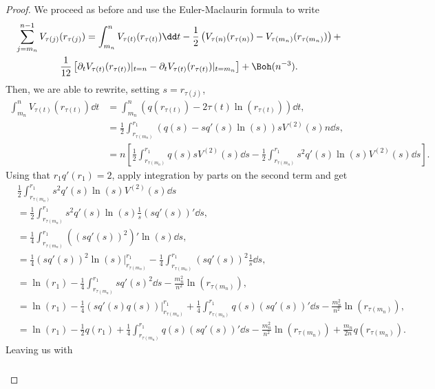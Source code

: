 \begin{proof}
We proceed as before and use the Euler-Maclaurin formula to write
\begin{multline}
	\sum_{j=m_n}^{n-1} V_{\tau(j)}(r_{\tau(j)}) = \int_{m_n}^n V_{\tau(t)}(r_{\tau(t)})  \dd t - \frac{1}{2} \left( V_{\tau(n)}(r_{\tau(n)})  - V_{\tau(m_n)}(r_{\tau(m_n)}) \right) + \\ \frac{1}{12} \left[ \partial_t V_{\tau(t)}(r_{\tau(t)}) |_{t=n} - \partial_t V_{\tau(t)}(r_{\tau(t)}) |_{t=m_n} \right] + \Boh(n^{-3}).
	\label{Equation: EulerMaclaurin 1 disk}
\end{multline}
Then, we are able to rewrite, setting $s = r_{\tau(j)}$,
\begin{align}
	\int_{m_n}^n V_{\tau(t)}(r_{\tau(t)})  \dd t & = \int_{m_n}^n (q(r_{\tau(t)}) - 2 \tau(t) \ln(r_{\tau(t)})) \dd t, \\
	& = \frac{1}{2} \int_{r_{\tau(m_n)}}^{r_1} (q(s) - s q'(s) \ln(s)) s V^{(2)}(s) n \dd s, \\
	& = n \left[  \frac{1}{2} \int_{r_{\tau(m_n)}}^{r_1} q(s) s V^{(2)}(s) \dd s -  \frac{1}{2} \int_{r_{\tau(m_n)}}^{r_1} s^2 q'(s) \ln(s) V^{(2)}(s) \dd s \right].
\end{align}
Using that $r_1 q'(r_1) = 2$, apply integration by parts on the second term and get
\begin{align}
	& \frac{1}{2} \int_{r_{\tau(m_n)}}^{r_1} s^2 q'(s) \ln(s) V^{(2)}(s) \dd s \\
	& = \frac{1}{2} \int_{r_{\tau(m_n)}}^{r_1} s^2 q'(s) \ln(s) \frac{1}{s} (s q'(s))' \dd s, \\
	& = \frac{1}{4} \int_{r_{\tau(m_n)}}^{r_1} ((sq'(s))^2)' \ln(s) \dd s, \\
	& = \frac{1}{4} (s q'(s))^2 \ln(s) |_{r_{\tau(m_n)}}^{r_1} - \frac{1}{4}  \int_{r_{\tau(m_n)}}^{r_1} (s q'(s))^2 \frac{1}{s} \dd s, \\
	& = \ln(r_1) - \frac{1}{4} \int_{r_{\tau(m_n)}}^{r_1} s q'(s)^2 \dd s - \frac{m_n^2}{n^2} \ln(r_{\tau(m_n)}), \\
	& = \ln(r_1) - \frac{1}{4} (s q'(s) q(s)) |_{r_{\tau(m_n)}}^{r_1} + \frac{1}{4} \int_{r_{\tau(m_n)}}^{r_1} q(s) (s q'(s))' \dd s  - \frac{m_n^2}{n^2} \ln(r_{\tau(m_n)}), \\
	& = \ln(r_1) - \frac{1}{2} q(r_1) + \frac{1}{4} \int_{r_{\tau(m_n)}}^{r_1} q(s) (s q'(s))'\dd s  - \frac{m_n^2}{n^2} \ln(r_{\tau(m_n)}) + \frac{m_n}{2 n} q(r_{\tau(m_n)}).
\end{align}
Leaving us with
\begin{align}
	& \begin{multlined}

\end{multlined}
\end{align}
\end{proof}
